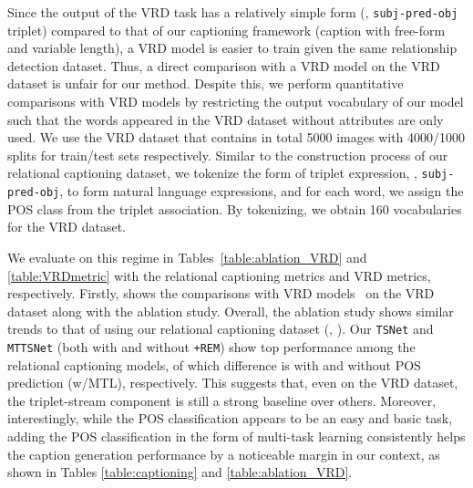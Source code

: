 {Since the output of the VRD task has {a} relatively simple form (\ie, \texttt{subj-pred-obj} triplet) compared to that {of} our captioning framework (caption with free-form and variable length), a VRD model is easier to train given the same relationship detection dataset.
Thus, a direct comparison with a VRD model on the VRD dataset \cite{lu2016visual} is unfair for our method.}
Despite this, we perform quantitative comparisons with VRD models by restricting {the output vocabulary of our model such that  the words {appeared} in the VRD dataset without attributes are only used.}
We use the VRD dataset that contains in total 5000 images with 4000/1000 splits for train/test sets respectively.
Similar to the construction process of our relational captioning dataset, we tokenize the form of triplet expression, \ie, \texttt{subj-pred-obj}, to form natural language expressions, and for each word, we assign the POS class from the triplet association.
By tokenizing, we obtain 160 vocabularies for the VRD dataset.


















{We evaluate on this regime in Tables~\ref{table:ablation_VRD} and \ref{table:VRDmetric} with the relational captioning metrics and VRD metrics, respectively. Firstly,}
 shows {the comparisons with VRD models~\cite{lu2016visual,yang2018shuffle} on the VRD dataset along with the ablation study.}
Overall, the ablation study shows similar {trends} to that of using our relational captioning dataset {(\cf, )}. 
{Our \texttt{TSNet} and \texttt{MTTSNet} ({both with and without \texttt{+REM}}) show top performance among the relational captioning models, {of which difference is with and without POS prediction (w/MTL), respectively}. 
This suggests that, even on the VRD dataset, the triplet-stream component is still a strong baseline over others.}
Moreover, interestingly, while the POS classification appears to be an easy and basic task, adding the POS classification in the form of multi-task learning consistently helps the caption generation performance by a noticeable margin in our context, as shown in Tables \ref{table:captioning} and \ref{table:ablation_VRD}.




